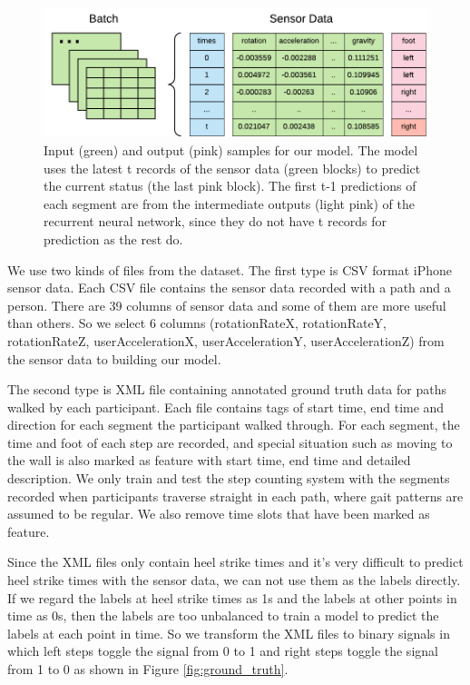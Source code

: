\documentclass[11pt]{article}
\begin{document}
\begin{figure}[ht]
\centering
\includegraphics[scale=1]{input2}
\caption{Input (green) and output (pink) samples for our model. The model uses the latest t records of the sensor data (green blocks) to predict the current status (the last pink block). The first t-1 predictions of each segment are from the intermediate outputs (light pink) of the recurrent neural network, since they do not have t records for prediction as the rest do.}
\label{fig:batch_sensor_data}
\end{figure}

We use two kinds of files from the dataset. The first type is CSV format iPhone sensor data.  Each CSV file contains the sensor data recorded with a path and a person. There are 39 columns of sensor data and some of them are more useful than others. So we select 6 columns (rotationRateX, rotationRateY, rotationRateZ,  userAccelerationX, userAccelerationY, userAccelerationZ) from the sensor data to building our model. 

The second type is XML file containing annotated ground truth data for paths walked by each participant. Each file contains tags of start time, end time and direction for each segment the participant walked through. For each segment, the time and foot of each step are recorded, and special situation such as moving to the wall is also marked as feature with start time, end time and detailed description. We only train and test the step counting system with the segments recorded when participants traverse straight in each path, where gait patterns are assumed to be regular. We also remove time slots that have been marked as feature. 

Since the XML files only contain heel strike times and it's very difficult to predict heel strike times with the sensor data, we can not use them as the labels directly. If we regard the labels at heel strike times as 1s and the labels at other points in time as 0s, then the labels are too unbalanced to train a model to predict the labels at each point in time. So we transform the XML files to binary signals in which left steps toggle the signal from 0 to 1 and right steps toggle the signal from 1 to 0 as shown in Figure \ref{fig:ground_truth}.
\end{document}
